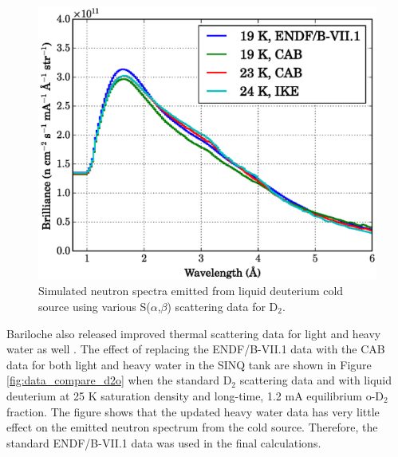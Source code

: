 \documentclass[5p,12pt]{elsarticle}
\begin{document}
\begin{figure}[h!] 
  \centering
    \includegraphics[width=\columnwidth]{graphics/data_compare_d2.eps}
     \caption{Simulated neutron spectra emitted from liquid deuterium cold source using various S($\alpha$,$\beta$) scattering data for D$_2$. \label{fig:data_compare_d2}}
\end{figure}  

Bariloche also released improved thermal scattering data for light and heavy water as well \cite{granada_d2o_1,granada_d2o_2,granada_d2o_3}.  The effect of replacing the ENDF/B-VII.1 data with the CAB data for both light and heavy water in the SINQ tank are shown in Figure \ref{fig:data_compare_d2o} when the standard D$_2$ scattering data and with liquid deuterium at 25 K  saturation density and long-time, 1.2 mA equilibrium o-D$_2$ fraction.  The figure shows that the updated heavy water data has very little effect on the emitted neutron spectrum from the cold source.  Therefore, the standard ENDF/B-VII.1 data was used in the final calculations.
\end{document}
